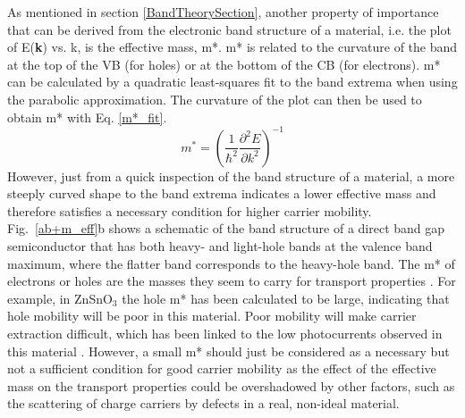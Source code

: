 \documentclass[11pt, twoside]{report}
\begin{document}
As mentioned in section \ref{BandTheorySection}, another property of importance that can be derived from the electronic band structure of a material, i.e. the plot of E(\textbf{k}) vs. k, is the effective mass, m*. m* is related to the curvature of the band at the top of the VB (for holes) or at the bottom of the CB (for electrons). m* can be calculated by a quadratic least-squares fit to the band extrema when using the parabolic approximation. The curvature of the plot can then be used to obtain m* with Eq. \ref{m*_fit}.
\begin{equation}\label{m*_fit}
m^* = \left( \frac{1}{\hbar^2}\frac{\partial^2 E}{\partial k^2} \right)^{-1}
\end{equation}
However, just from a quick inspection of the band structure of a material, a more steeply curved shape to the band extrema indicates a lower effective mass and therefore satisfies a necessary condition for higher carrier mobility. Fig.~\ref{ab+m_eff}b shows a schematic of the band structure of a direct band gap semiconductor that has both heavy- and light-hole bands at the valence band maximum, where the flatter band corresponds to the heavy-hole band.
The m* of electrons or holes are the masses they seem to carry for transport properties \cite{dielectric_const1}. For example, in ZnSnO$_3$ the hole m* has been calculated to be large, indicating that hole mobility will be poor in this material. Poor mobility will make carrier extraction difficult, which has been linked to the low photocurrents observed in this material \cite{effective_mass1}.
However, a small m* should just be considered as a necessary but not a sufficient condition for good carrier mobility as the effect of the effective mass on the transport properties could be overshadowed by other factors, such as the scattering of charge carriers by defects in a real, non-ideal material. 
\end{document}
